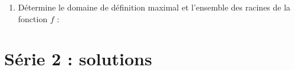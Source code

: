 \documentclass[a4paper,fontsize=13pt]{scrreprt}
\theoremstyle{plain}
\theoremstyle{definition}
\newenvironment{benumerate}[1][0pt]{\begin{enumerate}\renewcommand{\makelabel}[1]{\textbf{##1}}\setlength{\itemsep}{#1}}{\end{enumerate}}
\renewcommand{\d}{\displaystyle}
\begin{document}
\begin{benumerate}[14pt]
\item Détermine le domaine de définition maximal et l'ensemble des racines de la fonction $f$ :
\begin{benumerate}[5pt]
\end{benumerate}

\end{benumerate}

\newpage
\section{Série 2 : solutions}
\end{document}
